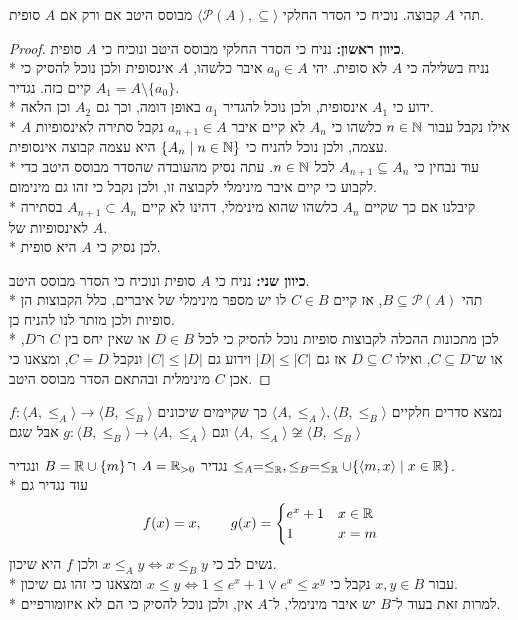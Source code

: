 \Question{}
תהי $A$ קבוצה. נוכיח כי הסדר החלקי $\langle \mathcal{P}(A), \subseteq \rangle$ מבוסס היטב אם ורק אם $A$ סופית.
\begin{proof}
	\textbf{כיוון ראשון:}
	נניח כי הסדר החלקי מבוסס היטב ונוכיח כי $A$ סופית. \\*
	נניח בשלילה כי $A$ לא סופית.
	יהי $a_0 \in A$ איבר כלשהו, $A$ אינסופית ולכן נוכל להסיק כי קיים כזה. נגדיר $A_1 = A \setminus \{ a_0 \}$. \\*
	ידוע כי $A_1$ אינסופית, ולכן נוכל להגדיר $a_1$ באופן דומה, וכך גם $A_2$ וכן הלאה. \\*
	אילו נקבל עבור $n \in \mathbb{N}$ כלשהו כי $A_n$ לא קיים איבר $a_{n + 1} \in A$ נקבל סתירה לאינסופיות $A$ עצמה, ולכן נוכל להניח כי $\{ A_n \mid n \in \mathbb{N} \}$ היא עצמה קבוצה אינסופית. \\*
	עוד נבחין כי $A_{n + 1} \subseteq A_n$ לכל $n \in \mathbb{N}$. עתה נסיק מהעובדה שהסדר מבוסס היטב כדי לקבוע כי קיים איבר מינימלי לקבוצה זו, ולכן נקבל כי זהו גם מינימום. \\*
	קיבלנו אם כך שקיים $A_n$ כלשהו שהוא מינימלי, דהינו לא קיים $A_{n + 1} \subset A_n$ בסתירה לאינסופיות של $A$. \\*
	לכן נסיק כי $A$ היא סופית.

	\textbf{כיוון שני:}
	נניח כי $A$ סופית ונוכיח כי הסדר מבוסס היטב. \\*
	תהי $B \subseteq \mathcal{P}(A)$, אז קיים $C \in B$ לו יש מספר מינימלי של איברים, כלל הקבוצות הן סופיות ולכן מותר לנו להניח כן. \\*
	לכן מתכונות ההכלה לקבוצות סופיות נוכל להסיק כי לכל $D \in B$ או שאין יחס בין $C$ ו־$D$, או ש־$C \subseteq D$, ואילו $D \subseteq C$ אז גם $|D| \le |C|$ וידוע גם $|C| \le |D|$ ונקבל $C = D$,
	ומצאנו כי אכן $C$ מינימלית ובהתאם הסדר מבוסס היטב.
\end{proof}

\Question{}
נמצא סדרים חלקיים $\langle A, \le_A \rangle, \langle B, \le_B \rangle$ כך שקיימים שיכונים $f : \langle A, \le_A \rangle \to \langle B, \le_B \rangle$
וגם $g : \langle B, \le_B \rangle \to \langle A, \le_A \rangle$ אבל שגם $\langle A, \le_A \rangle \not\cong \langle B, \le_B \rangle$

נגדיר $A = \mathbb{R}_{>0}$ ו־$B = \mathbb{R} \cup \{ m\}$ ונגדיר $\le_A = \le_{\mathbb{R}}, \le_B = \le_{\mathbb{R}} \cup \{ \langle m, x \rangle \mid x \in \mathbb{R} \}$. \\*
עוד נגדיר גם
\[
	f(x) = x,
	\qquad
	g(x) = \begin{cases}
		e^x + 1 & x \in \mathbb{R} \\
		1 & x = m
	\end{cases}
\]
נשים לב כי $x \le_A y \iff x \le_B y$ ולכן $f$ היא שיכון. \\*
עבור $x, y \in B$ נקבל כי $x \le y \iff 1 \le e^x + 1 \lor e^x \le x^y$ ומצאנו כי זהו גם שיכון. \\*
למרות זאת בעוד ל־$B$ יש איבר מינימלי, ל־$A$ אין, ולכן נוכל להסיק כי הם לא איזומורפיים.

